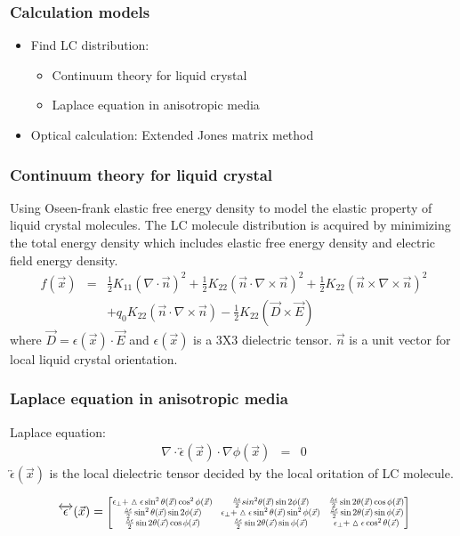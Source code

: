 \documentclass{beamer}
\newcommand\scalemath[2]{\scalebox{#1}{\mbox{\ensuremath{\displaystyle #2}}}} %
\begin{document}
\begin{frame}
\frametitle{Calculation models}
\begin{itemize}
\item<1-> Find LC distribution:
\begin{itemize}
\item<1-> Continuum theory for liquid crystal
\item<1-> Laplace equation in anisotropic media
\end{itemize}
\item<1-> Optical calculation: Extended Jones matrix method
\end{itemize}
\end{frame}
\begin{frame}
\frametitle{Continuum theory for liquid crystal}
Using Oseen-frank elastic free energy density to model the elastic property of liquid crystal molecules.
The LC molecule distribution is acquired by minimizing the total energy density which includes elastic free energy density and electric field energy density.
\begin{eqnarray}
f(\vec x) &=& \frac{1}{2}K_{11}(\nabla\cdot\vec n)^2+\frac{1}{2}K_{22}(\vec n\cdot\nabla\times\vec n)^2 + \frac{1}{2}K_{22}(\vec n\times\nabla\times\vec n)^2\nonumber \\
&&+q_0K_{22}(\vec n\cdot\nabla\times\vec n) - \frac{1}{2}K_{22}(\vec D\times\vec E)\nonumber
\label{eq:free_energy}
\end{eqnarray}
where $\vec D = \epsilon(\vec x)\cdot \vec E$ and $\epsilon(\vec x)$ is a 3X3 dielectric tensor. $\vec n$ is a unit vector for local liquid crystal orientation.
\end{frame}
\begin{frame}
\frametitle{Laplace equation in anisotropic media}
Laplace equation:
\begin{eqnarray}
\nabla \cdot \overleftrightarrow{\epsilon}(\vec x) \cdot \nabla \phi(\vec x) &=& 0 \nonumber
\label{eq:laplace}
\end{eqnarray}
$\overleftrightarrow{\epsilon}(\vec x)$ is the local dielectric tensor decided by the local oritation of LC molecule. 

\begin{eqnarray}
\overleftrightarrow{\epsilon}(\vec x) = 
\scalemath{0.7}{
\begin{bmatrix}
\epsilon_{\perp}+\vartriangle\epsilon \sin^2\theta(\vec{x})\cos^2\phi(\vec{x}) & \frac{\vartriangle\epsilon}{2} sin^2\theta(\vec{x})\sin 2\phi(\vec{x}) & \frac{\vartriangle\epsilon}{2} \sin 2\theta(\vec{x})\cos\phi(\vec{x}) \\
\frac{\vartriangle\epsilon}{2} \sin^2\theta(\vec{x})\sin 2\phi(\vec{x}) & \epsilon_{\perp}+\vartriangle\epsilon \sin^2\theta(\vec{x})\sin^2\phi(\vec{x}) & \frac{\vartriangle\epsilon}{2} \sin 2\theta(\vec{x})\sin\phi(\vec{x}) \\
\frac{\vartriangle\epsilon}{2} \sin 2\theta(\vec{x})\cos\phi(\vec{x}) & \frac{\vartriangle\epsilon}{2} \sin 2\theta(\vec{x})\sin\phi(\vec{x}) & \epsilon_{\perp}+\vartriangle\epsilon \cos^2\theta(\vec{x})\\ 
\end{bmatrix}}
\nonumber
\label{eq:dielectric_tensor}
\end{eqnarray}
\end{frame}
\end{document}
